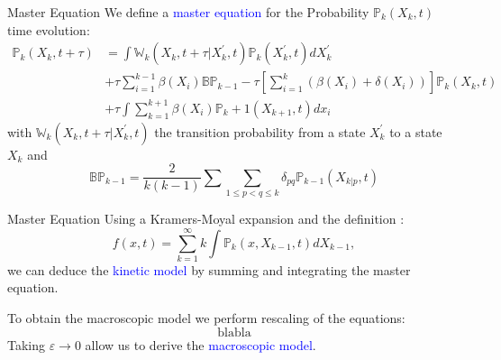 \documentclass[10pt]{beamer}
\theoremstyle{remark}
\begin{document}
\begin{frame}{Master Equation}
We define a \textcolor{blue}{master equation} for the Probability  $\mathbb{P}_k(X_{k}, t)$ time evolution:
\begin{align*}
\label{masterEquation}
\mathbb{P}_k(X_k, t+\tau) &= \int \mathbb{W}_k(X_k, t+\tau \vert X_k^{'},t)\mathbb{P}_k( X_k^{'},t)d X_k^{'} \nonumber \\ 
&+ \tau \sum_{i=1}^{k-1}\beta(X_i) \mathbb{B} \mathbb{P}_{k-1} - \tau \left[ \sum_{i=1}^{k} (\beta(X_i) + \delta(X_i)) \right] \mathbb{P}_k(X_k,t) \\ 
&+ \tau \int \sum_{k=1}^{k+1} \beta(X_i) \mathbb{P}{_k+1}(X_{k+1}, t)dx_i \nonumber
\end{align*}
with $\mathbb{W}_k(X_k, t+\tau \vert X_k^{'},t)$ the transition probability from a state $X_k^{'}$ to a state $X_k$ and 
\begin{equation*}
\label{birthOperator}
\mathbb{B} \mathbb{P}_{k-1} = \dfrac{2}{k(k-1)} \sum \sum_{1 \leq p < q \leq k} \delta_{pq} \mathbb{P}_{k-1} (X_{k|p},t) 
\end{equation*}
\end{frame}

\begin{frame}{Master Equation}
Using a Kramers-Moyal expansion and the definition : $$f(x,t) =  \sum_{k=1}^{\infty} k \int \mathbb{P}_k(x, X_{k-1}, t)dX_{k-1},$$
we can deduce the \textcolor{blue}{kinetic model} by summing and integrating the master equation.
\vspace{0.3cm}

To obtain the macroscopic model we perform rescaling of the equations:
\[\text{blabla}\]
Taking $\varepsilon\rightarrow0$ allow us to derive the \textcolor{blue}{macroscopic model}.
\end{frame}
\end{document}
